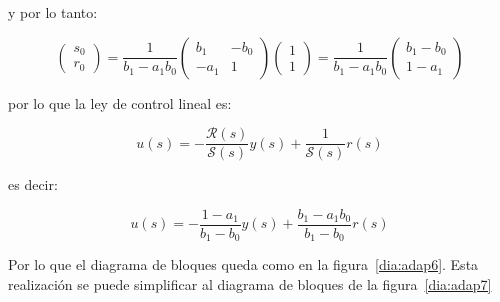             y por lo tanto:

            \begin{equation*}
                \begin{pmatrix}
                    s_0 \\
                    r_0
                \end{pmatrix} = \frac{1}{b_1 - a_1 b_0}
                \begin{pmatrix}
                    b_1 & -b_0 \\
                    -a_1 & 1
                \end{pmatrix}
                \begin{pmatrix}
                    1 \\
                    1
                \end{pmatrix} = \frac{1}{b_1 - a_1 b_0}
                \begin{pmatrix}
                    b_1 - b_0 \\
                    1 - a_1
                \end{pmatrix}
            \end{equation*}

            por lo que la ley de control lineal es:

            \begin{equation*}
                u(s) = - \frac{\mathcal{R}(s)}{\mathcal{S}(s)} y(s) + \frac{1}{\mathcal{S}(s)} r(s)
            \end{equation*}

            es decir:

            \begin{equation}
                u(s) = - \frac{1 - a_1}{b_1 - b_0} y(s) + \frac{b_1 - a_1 b_0}{b_1 - b_0} r(s)
            \end{equation}

            Por lo que el diagrama de bloques queda como en la figura~\ref{dia:adap6}. Esta realización se puede simplificar al diagrama de bloques de la figura~\ref{dia:adap7}

